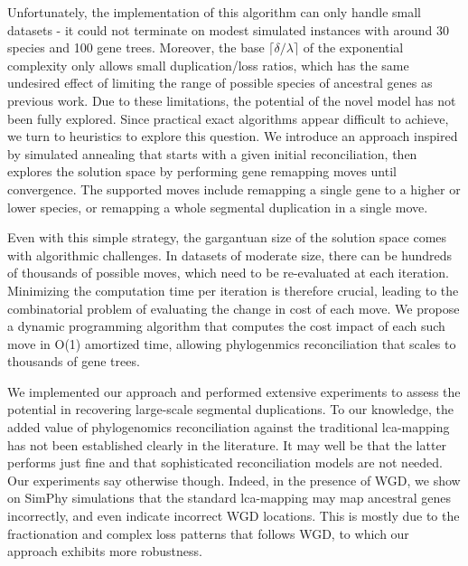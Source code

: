 \documentclass[10pt]{article}
\begin{document}
Unfortunately, the implementation of this algorithm can only handle small datasets - it could not terminate on modest simulated instances with around 30 species and 100 gene trees.  Moreover, the base $\lceil \delta/\lambda \rceil$ of the exponential complexity only allows small duplication/loss ratios, which has the same undesired effect of limiting the range of possible species of ancestral genes as previous work.  
Due to these limitations, the potential of the novel model has not been fully explored.  Since practical exact algorithms appear difficult to achieve, we turn to heuristics to explore this question.  We introduce an approach inspired by simulated annealing that starts with a given initial reconciliation, then explores the solution space by performing gene remapping moves until convergence.  
The supported moves include remapping a single gene to a higher or lower species, or remapping a whole segmental duplication in a single move.

Even with this simple strategy, the gargantuan size of the solution space comes with algorithmic challenges.  In datasets of moderate size, there can be hundreds of thousands of possible moves, which need to be re-evaluated at each iteration.  Minimizing the computation time per iteration is therefore crucial, leading to the combinatorial problem of evaluating the change in cost of each move. 
We propose a dynamic programming algorithm that computes the cost impact of each such move in O(1) amortized time, allowing phylogenmics reconciliation that scales to thousands of gene trees.  


We implemented our approach and performed extensive experiments to assess the potential in recovering large-scale segmental duplications.  To our knowledge, the added value of phylogenomics reconciliation against the traditional lca-mapping has not been established clearly in the literature.  It may well be that the latter performs just fine and that sophisticated reconciliation models are not needed.  Our experiments say otherwise though.  
Indeed, in the presence of WGD, we show on SimPhy simulations that the standard lca-mapping may map ancestral genes incorrectly, and even indicate incorrect WGD locations.  This is mostly due to the fractionation and complex loss patterns that follows WGD, to which our approach exhibits more robustness.
\end{document}
